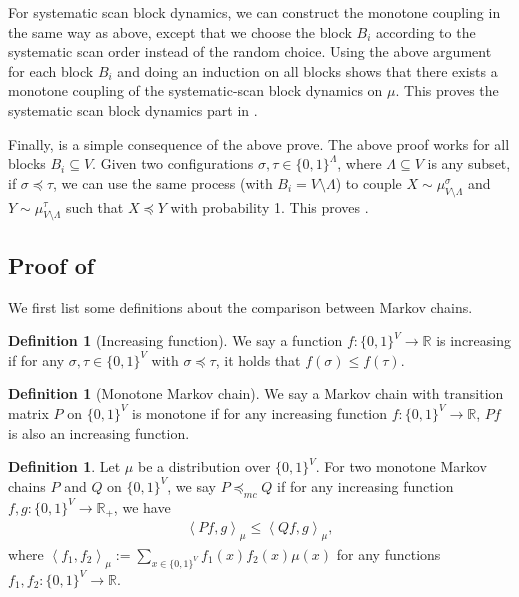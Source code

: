 \documentclass[11pt]{amsart}
\theoremstyle{definition}
\newtheorem{definition}[theorem]{Definition}
\theoremstyle{remark}
\begin{document}
For systematic scan block dynamics, we can construct the monotone coupling in the same way as above, except that we choose the block $B_i$ according to the systematic scan order instead of the random choice. Using the above argument for each block $B_i$ and doing an induction on all blocks  shows that there exists a monotone coupling of the systematic-scan block dynamics on $\mu$. This proves the systematic scan block dynamics part in .

Finally,  is a simple consequence of the above prove. The above proof works for all blocks $B_i\subseteq V$. Given two configurations $\sigma,\tau \in \{0,1\}^\Lambda$, where $\Lambda \subseteq V$ is any subset, if $\sigma \preceq \tau$, we can use the same process (with $B_i = V \setminus \Lambda$) to couple $ X \sim \mu^\sigma_{V \setminus \Lambda}$ and $Y \sim \mu^\tau_{V \setminus \Lambda}$ such that $X \preceq Y$ with probability 1. This proves .


\subsection{Proof of \texorpdfstring{}{Claim 35}}
We first list some definitions about the comparison between Markov chains.
\begin{definition}[Increasing function]
    We say a function $f:\{0,1\}^V\to \mathbb{R}$ is increasing if for any $\sigma,\tau\in \{0,1\}^V$ with $\sigma\preceq \tau$, it holds that $f(\sigma)\leq f(\tau)$.
\end{definition}

\begin{definition}[Monotone Markov chain]
    We say a Markov chain with transition matrix $P$ on $\{0,1\}^V$ is monotone if for any increasing function $f:\{0,1\}^V\to \mathbb{R}$, $Pf$ is also an increasing function.
\end{definition}

\begin{definition}
    Let $\mu$ be a distribution over $\{0,1\}^V$.
For two monotone Markov chains $P$ and $Q$  on $\{0,1\}^V$, we say $P\preceq_{mc} Q$ if for any increasing function $f,g:\{0,1\}^V\to \mathbb{R}_+$, we have
\begin{align*}
    \left \langle Pf,g \right \rangle_{\mu} \leq  \left \langle Qf,g \right \rangle_{\mu},
\end{align*}
where $\left \langle f_1,f_2 \right \rangle_{\mu}:=\sum_{x\in \{0,1\}^V} f_1(x)f_2(x)\mu(x)$ for any functions $f_1,f_2:\{0,1\}^V\to \mathbb{R}$.
\end{definition}
\end{document}
